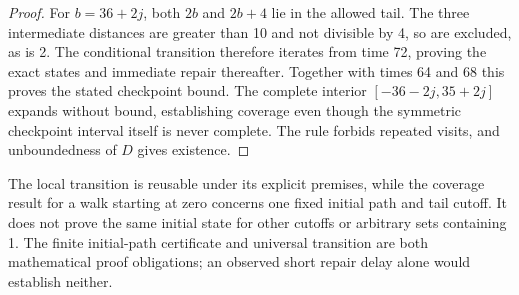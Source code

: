 \documentclass[11pt,a4paper]{article}
\begin{document}
\begin{proof}
For $b=36+2j$, both $2b$ and $2b+4$ lie in the allowed tail. The three
intermediate distances are greater than 10 and not divisible by 4, so are
excluded, as is 2. The conditional transition therefore iterates from
time 72, proving the exact states and immediate repair thereafter.
Together with times 64 and 68 this proves the stated checkpoint bound.
The complete interior $[-36-2j,35+2j]$ expands without bound, establishing
coverage even though the symmetric checkpoint interval itself is never complete.
The rule forbids repeated visits, and unboundedness of $D$ gives existence.
\end{proof}
The local transition is reusable under its explicit premises, while the
coverage result for a walk starting at zero concerns one fixed initial path
and tail cutoff.
It does not prove the same initial state for other cutoffs or arbitrary sets
containing 1. The finite initial-path certificate and universal transition are
both mathematical proof obligations; an observed short repair delay alone
would establish neither.
\end{document}
